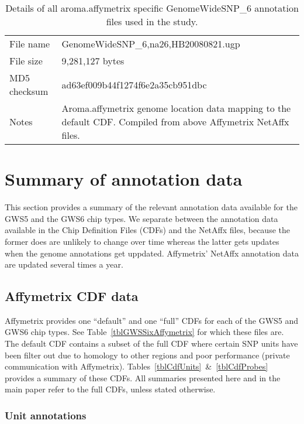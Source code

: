 \documentclass[10pt,a4paper]{article}
\begin{document}
\begin{table}[htp]
\begin{center}
\begin{tabular}{lp{}}
\hline
File name    & GenomeWideSNP\_6,na26,HB20080821.ugp \\
File size    & 9,281,127 bytes \\
MD5 checksum & ad63ef009b44f1274f6e2a35cb951dbc \\
Notes        & Aroma.affymetrix genome location data mapping to the default CDF.  Compiled from above Affymetrix NetAffx files. \\
\hline
\end{tabular}
\end{center}
\caption{Details of all aroma.affymetrix specific GenomeWideSNP\_6 annotation files used in the study.}
\label{tblGWSSixAromaAffymetrix}
\end{table}



\clearpage
\section{Summary of annotation data}

This section provides a summary of the relevant annotation data available for the GWS5 and the GWS6 chip types.  We separate between the annotation data available in the Chip Definition Files (CDFs) and the NetAffx files, because the former does are unlikely to change over time whereas the latter gets updates when the genome annotations get uppdated.  Affymetrix' NetAffx annotation data are updated several times a year.

\subsection{Affymetrix CDF data}

Affymetrix provides one ``default'' and one ``full'' CDFs for each of the GWS5 and GWS6 chip types.  See Table~\ref{tblGWSSixAffymetrix} for which these files are.
The default CDF contains a subset of the full CDF where certain SNP units have been filter out due to homology to other regions and poor performance (private communication with Affymetrix).
Tables~\ref{tblCdfUnits}~\&~\ref{tblCdfProbes} provides a summary of these CDFs.
All summaries presented here and in the main paper refer to the full CDFs, unless stated otherwise.

\subsubsection{Unit annotations}
\end{document}

